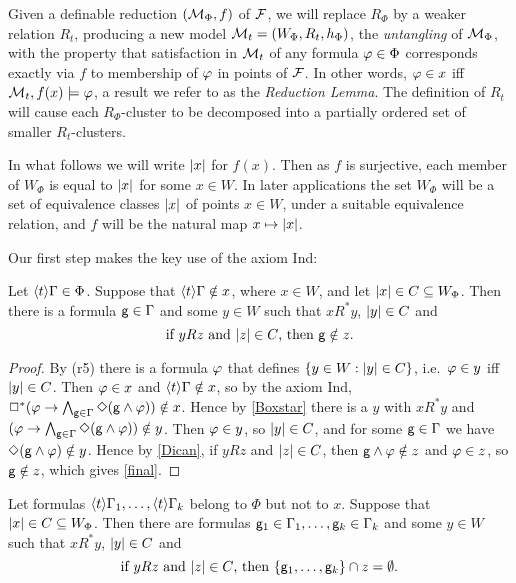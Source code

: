 Given a definable reduction  $(\mathcal{M}_\Phi,f)$ of $\mathcal{F}$,  we will  replace $R_\Phi$ by a weaker relation $R_t$, producing a new model 
$\mathcal{M}_t=(W_\Phi,R_t,h_\Phi)$, the \emph{untangling} of $\mathcal{M}_\Phi$, with the property that satisfaction  in  $\mathcal{M}_t$ of any formula $\varphi\in\Phi$ corresponds exactly via $f$ to membership of $\varphi$ in points of $\mathcal{F}$. In other words, $\varphi\in x$ iff $\mathcal{M}_t,f(x)\models\varphi$, a result we refer to as the \emph{Reduction Lemma}. The definition of $R_t$ will cause
each $R_\Phi$-cluster to be decomposed into a partially ordered set of smaller $R_t$-clusters.

In what follows we will write  $|x|$ for $f(x)$. Then as $f$ is surjective, each member of $W_\Phi$ is equal to $|x|$ for some $x\in W$. In later applications  the set $W_\Phi$ will  be a set of equivalence classes $|x|$ of points $x\in W$, under a suitable equivalence relation, and $f$ will be the natural map $x\mapsto|x|$.

Our first step  makes the key use of the axiom Ind:


\begin{lemma} \label{useind}
Let $\langle t\rangle\Gamma\in\Phi$. Suppose that $\langle t\rangle\Gamma\notin x$, where $x\in W$, and let $|x|\in C\subseteq W_\Phi$. Then there is a formula ${\sf g}\in\Gamma$ and some $y\in W$ such that $xR^*y$, $|y|\in C$ and
\begin{equation} \label{final}
\text{if $yRz$ and $\ab{z}\in C$, then $\g\notin z$.}
\end{equation}
\end{lemma}

\begin{proof}
By (r5) there is a formula $\varphi$ that defines $\{y\in W:|y|\in C\}$, i.e.\ $\varphi\in y$ iff $|y|\in C$.
Then $\varphi\in x$ and $\langle t\rangle\Gamma\notin x$, so by the axiom Ind,  %
$
\Box^*(\varphi\to \bigwedge_{{\sf g}\in\Gamma}\Diamond({\sf g}\land\varphi))\notin x
$.
Hence by \eqref{Boxstar} there is a $y$ with $xR^*y$ and $(\varphi\to \bigwedge_{{\sf g}\in\Gamma}\Diamond({\sf g}\land\varphi))\notin y$.
Then
$\varphi\in y$, so $|y|\in C$, and  for some ${\sf g}\in\Gamma$ we have $\Diamond({\sf g}\land\varphi)\notin y$. Hence by \eqref{Dican}, if $yRz$ and  $|z|\in C$, then ${\sf g}\land\varphi\notin z$ and $\varphi\in z$, so ${\sf g}\notin z$, which gives \eqref{final}.
\end{proof}

\begin{lemma} \label{extend}
Let formulas $\langle t\rangle\Gamma_1,\dots,\langle t\rangle\Gamma_k$ belong to $\Phi$ but not to $x$.  Suppose that  $|x|\in C\subseteq W_\Phi$. Then there are formulas ${\sf g}_1\in\Gamma_1,\dots,{\sf g}_k\in\Gamma_k$ and some $y\in W$ such that $xR^*y$, $|y|\in C$ and
\begin{equation} \label{final2}
\text{if $yRz$ and $\ab{z}\in C$, then $\{\g_1,\dots,\g_k\}\cap z=\emptyset$.}
\end{equation}
\end{lemma}

